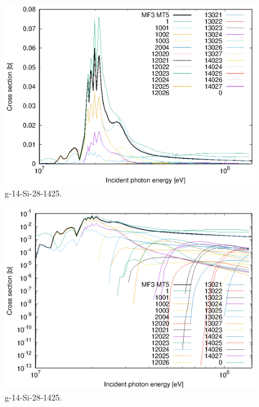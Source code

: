\begin{figure}
 \includegraphics[width=\linewidth]{eps/g_14-Si-28_1425.eps}
  \caption{g-14-Si-28-1425.}
\end{figure}
\begin{figure}
 \includegraphics[width=\linewidth]{eps-log/g_14-Si-28_1425.eps}
 \caption{g-14-Si-28-1425.}
\end{figure}
\newpage \clearpage


